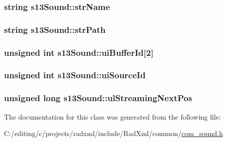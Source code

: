\hypertarget{classs13_sound_a9b8c42dffe53e718d3ab9478880fd82d}{
\subsubsection[{str\-Name}]{\setlength{\rightskip}{0pt plus 5cm}string s13\-Sound\-::str\-Name}}\label{classs13_sound_a9b8c42dffe53e718d3ab9478880fd82d}
\hypertarget{classs13_sound_ad4860e1fd6ea18e0f7fe4c8edaf9d1ed}{
\subsubsection[{str\-Path}]{\setlength{\rightskip}{0pt plus 5cm}string s13\-Sound\-::str\-Path}}\label{classs13_sound_ad4860e1fd6ea18e0f7fe4c8edaf9d1ed}
\hypertarget{classs13_sound_a6284bb7e2824b610798c58e1a6e87953}{
\subsubsection[{ui\-Buffer\-Id}]{\setlength{\rightskip}{0pt plus 5cm}unsigned int s13\-Sound\-::ui\-Buffer\-Id\mbox{[}2\mbox{]}}}\label{classs13_sound_a6284bb7e2824b610798c58e1a6e87953}
\hypertarget{classs13_sound_a400265e13e002a318cbf28e7838ef4e9}{
\subsubsection[{ui\-Source\-Id}]{\setlength{\rightskip}{0pt plus 5cm}unsigned int s13\-Sound\-::ui\-Source\-Id}}\label{classs13_sound_a400265e13e002a318cbf28e7838ef4e9}
\hypertarget{classs13_sound_a3cc9ad36364c61a79b0572b58e9f488d}{
\subsubsection[{ul\-Streaming\-Next\-Pos}]{\setlength{\rightskip}{0pt plus 5cm}unsigned long s13\-Sound\-::ul\-Streaming\-Next\-Pos}}\label{classs13_sound_a3cc9ad36364c61a79b0572b58e9f488d}


The documentation for this class was generated from the following file\-:\begin{DoxyCompactItemize}
\item 
C\-:/editing/c/projects/radxml/include/\-Rad\-Xml/common/\hyperlink{com__sound_8h}{com\-\_\-sound.\-h}\end{DoxyCompactItemize}
